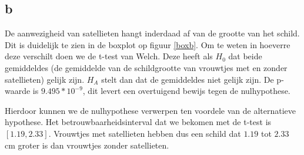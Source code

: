 \documentclass[11pt, a4paper]{article}
\begin{document}
\subsection*{b}
De aanwezigheid van satellieten hangt inderdaad af van de grootte van het schild. Dit is duidelijk te zien in de boxplot op figuur \ref{boxb}. Om te weten in hoeverre deze verschilt doen we de t-test van Welch. Deze heeft als $H_0$ dat beide gemiddeldes (de gemiddelde van de schildgrootte van vrouwtjes met en zonder satellieten) gelijk zijn. $H_A$ stelt dan dat de gemiddeldes niet gelijk zijn. De p-waarde is $9.495 * 10^{-9}$, dit levert een overtuigend bewijs tegen de nulhypothese. 
\begin{figure}
\end{figure}

Hierdoor kunnen we de nulhypothese verwerpen ten voordele van de alternatieve hypothese. Het betrouwbaarheidsinterval dat we bekomen met de t-test is $[1.19, 2.33]$. Vrouwtjes met satellieten hebben dus een schild dat $1.19$ tot $2.33$ cm groter is dan vrouwtjes zonder satellieten.
\end{document}
